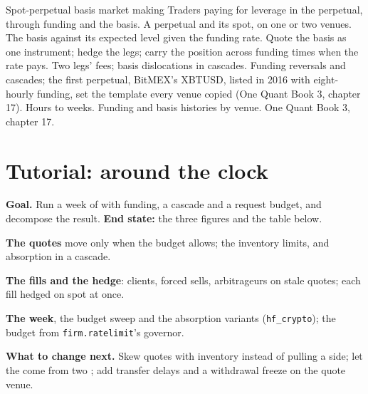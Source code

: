 \begin{strategyfile}{Spot-perpetual basis market making}\label{strat:hf:crypto-high-frequency-trading-on-centralised-venues:basis}
 Traders paying for leverage in the perpetual, through funding and the basis.
 A perpetual and its spot, on one or two venues.
 The basis against its expected level given the funding rate.
 Quote the basis as one instrument; hedge the legs; carry the position across funding times when the rate pays.
 Two legs' fees; basis dislocations in cascades.
 Funding reversals and cascades; the first perpetual, BitMEX's XBTUSD, listed in 2016 with eight-hourly funding, set the template
every venue copied (One Quant Book 3, chapter 17).
 Hours to weeks.
 Funding and basis histories by venue.
 One Quant Book 3, chapter 17.
\end{strategyfile}

\section{Tutorial: around the clock}\label{tut:hf:crypto-high-frequency-trading-on-centralised-venues:tut}

\begin{tutorial}
\textbf{Goal.} Run a week of  with funding, a cascade and a request budget, and decompose the result.
\textbf{End state:} the three figures and the table below.
\begin{tutsteps}
\item \textbf{The quotes} move only when the budget allows; the inventory limits, and absorption in a cascade.
\label{lst:hf:crypto-high-frequency-trading-on-centralised-venues:quote}
\item \textbf{The fills and the hedge}: clients, forced sells, arbitrageurs on stale quotes; each fill hedged on spot at once.
\label{lst:hf:crypto-high-frequency-trading-on-centralised-venues:fills}
\item \textbf{The week}, the budget sweep and the absorption variants (\texttt{hf\_crypto}); the budget from \texttt{firm.ratelimit}'s governor.
\end{tutsteps}
\textbf{What to change next.} Skew quotes with inventory instead of pulling a side; let the  come from two ; add transfer
delays and a withdrawal freeze on the quote venue.
\end{tutorial}

